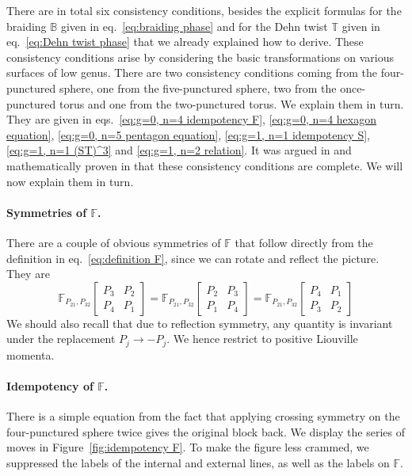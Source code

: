 \documentclass[12pt,a4paper]{article}
\newcommand{\be}{\begin{equation}}
\newcommand{\ee}{\end{equation}}
\begin{document}
There are in total six consistency conditions, besides the explicit formulas for the braiding $\mathbb{B}$ given in eq.~\eqref{eq:braiding phase} and for the Dehn twist $\mathbb{T}$ given in eq.~\eqref{eq:Dehn twist phase} that we already explained how to derive. These consistency conditions arise by considering the basic transformations on various surfaces of low genus. There are two consistency conditions coming from the four-punctured sphere, one from the five-punctured sphere, two from the once-punctured torus and one from the two-punctured torus. We explain them in turn. They are given in eqs.~\eqref{eq:g=0, n=4 idempotency F}, \eqref{eq:g=0, n=4 hexagon equation}, \eqref{eq:g=0, n=5 pentagon equation}, \eqref{eq:g=1, n=1 idempotency S}, \eqref{eq:g=1, n=1 (ST)^3} and \eqref{eq:g=1, n=2 relation}.
It was argued in \cite{Moore:1988qv} and mathematically proven in \cite{Bakalov:2000} that these consistency conditions are complete. We will now explain them in turn.

\paragraph{Symmetries of $\mathbb{F}$.} There are a couple of obvious symmetries of $\mathbb{F}$ that follow directly from the definition in eq.~\eqref{eq:definition F}, since we can rotate and reflect the picture. They are
\be 
\mathbb{F}_{P_{21},P_{32}}\!\begin{bmatrix}
    P_3 & P_2 \\ P_4 & P_1
\end{bmatrix}=
\mathbb{F}_{P_{21},P_{32}}\!\begin{bmatrix}
    P_2 & P_3 \\ P_1 & P_4
\end{bmatrix}=
\mathbb{F}_{P_{21},P_{32}}\!\begin{bmatrix}
    P_4 & P_1 \\ P_3 & P_2
\end{bmatrix} \label{eq:obvious symmetries}
\ee
We should also recall that due to reflection symmetry, any quantity is invariant under the replacement $P_j \to -P_j$. We hence restrict to positive Liouville momenta.

\paragraph{Idempotency of $\mathbb{F}$.}
There is a simple equation from the fact that applying crossing symmetry on the four-punctured sphere twice gives the original block back. We display the series of moves in Figure~\ref{fig:idempotency F}. To make the figure less crammed, we suppressed the labels of the internal and external lines, as well as the labels on $\mathbb{F}$.
\end{document}
